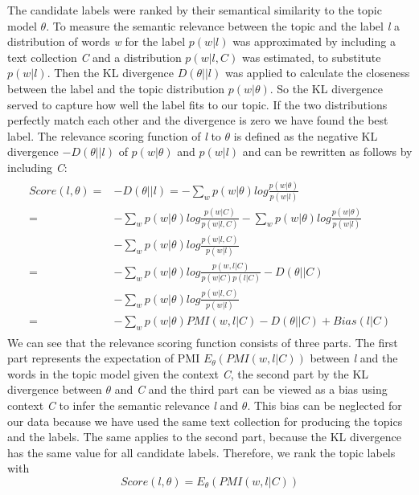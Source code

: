 The candidate labels were ranked by their semantical similarity to the topic model $\theta$. To measure the semantic relevance between the topic and the label \textit{l} a distribution of words \textit{w} for the label $p(w|l)$ was approximated by including a text collection \textit{C} and a distribution $p(w|l,C)$ was estimated, to substitute $p(w|l)$. Then the \ac{KL} divergence $D(\theta||l)$ was applied to calculate the closeness between the label and the topic distribution $p(w|\theta)$. So the \ac{KL} divergence served to capture how well the label fits to our topic. If the two distributions perfectly match each other and the divergence is zero we have found the best label. 
The relevance scoring function of \textit{l}  to $\theta$ is defined as the negative \ac{KL} divergence $-D(\theta||l)$ of $p(w|\theta)$ and $p(w|l)$ and can be rewritten as follows by including \textit{C}:
\begin{align}
\begin{split}
	Score(l,\theta) = &-D(\theta||l) =
	-\sum_{w} p(w|\theta)log\frac{p(w|\theta)}{p(w|l)}\\ =
	&-\sum_{w} p(w|\theta)log\frac{p(w|C)}{p(w|l,C)} -\sum_{w} p(w|\theta)log\frac{p(w|\theta)}{p(w|l)}\\ &-\sum_{w} p(w|\theta)log\frac{p(w|l,C)}{p(w|l)} \\ =
	&-\sum_{w} p(w|\theta)log\frac{p(w,l|C)}{p(w|C) p(l|C)} -D(\theta||C)\\ &-\sum_{w} p(w|\theta)log\frac{p(w|l,C)}{p(w|l)}\\  =
	&-\sum_{w} p(w|\theta) PMI(w,l|C)-D(\theta||C) + Bias(l|C) 
\end{split}
\end{align}
We can see that the relevance scoring function consists of three parts. The first part represents the expectation of \ac{PMI} $E_{\theta}(PMI(w,l|C))$ between \textit{l} and the words in the topic model given the context \textit{C}, the second part by the \ac{KL} divergence between $\theta$ and \textit{C} and the third part can be viewed as a bias using context
\textit{C} to infer the semantic relevance \textit{l} and $\theta$. This bias can be neglected for our data because we have used the same text collection for  producing the topics and the labels. The same applies to the second part, because the \ac{KL} divergence has the same value for all candidate labels. Therefore, we rank the topic labels with 
\begin{equation}
Score(l,\theta) = E_{\theta}(PMI(w,l|C))
\label{Mei:Scoring}
\end{equation}

